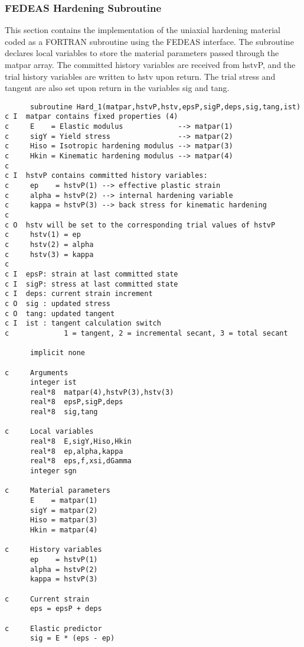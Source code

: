 \documentclass[12pt]{article}
\begin{document}
\subsubsection{FEDEAS Hardening Subroutine}
This section contains the implementation of the uniaxial hardening material coded as a
FORTRAN subroutine using the FEDEAS interface. The subroutine declares local variables
to store the material parameters passed through the matpar array. The committed history
variables are received from hstvP, and the trial history variables are written to hstv
upon return. The trial stress and tangent are also set upon return in the variables
sig and tang.

{\sf\small
\begin{verbatim}
      subroutine Hard_1(matpar,hstvP,hstv,epsP,sigP,deps,sig,tang,ist)
c I  matpar contains fixed properties (4)
c     E    = Elastic modulus             --> matpar(1)
c     sigY = Yield stress                --> matpar(2)
c     Hiso = Isotropic hardening modulus --> matpar(3)
c     Hkin = Kinematic hardening modulus --> matpar(4)
c
c I  hstvP contains committed history variables:
c     ep    = hstvP(1) --> effective plastic strain
c     alpha = hstvP(2) --> internal hardening variable
c     kappa = hstvP(3) --> back stress for kinematic hardening
c	 
c O  hstv will be set to the corresponding trial values of hstvP
c     hstv(1) = ep    
c     hstv(2) = alpha 
c     hstv(3) = kappa 
c
c I  epsP: strain at last committed state
c I  sigP: stress at last committed state
c I  deps: current strain increment
c O  sig : updated stress
c O  tang: updated tangent
c I  ist : tangent calculation switch 
c             1 = tangent, 2 = incremental secant, 3 = total secant

      implicit none
 
c     Arguments
      integer ist
      real*8  matpar(4),hstvP(3),hstv(3)
      real*8  epsP,sigP,deps
      real*8  sig,tang

c     Local variables
      real*8  E,sigY,Hiso,Hkin
      real*8  ep,alpha,kappa   
      real*8  eps,f,xsi,dGamma
      integer sgn

c     Material parameters
      E    = matpar(1)
      sigY = matpar(2)
      Hiso = matpar(3)
      Hkin = matpar(4)

c     History variables
      ep    = hstvP(1)
      alpha = hstvP(2)
      kappa = hstvP(3)

c     Current strain
      eps = epsP + deps    

c     Elastic predictor
      sig = E * (eps - ep)


\end{verbatim}}
\end{document}
